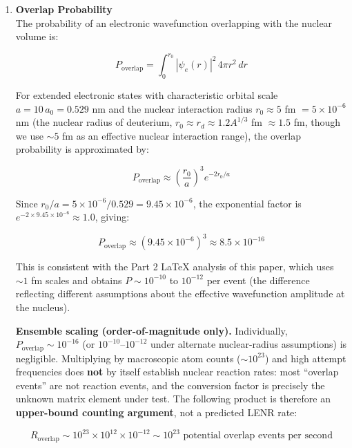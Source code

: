 \documentclass[11pt,a4paper]{article}
\begin{document}
\begin{enumerate}
\def\labelenumi{\arabic{enumi}.}
\item
  \textbf{Overlap Probability}\\
  The probability of an electronic wavefunction overlapping with the nuclear volume is:

  \begin{equation}
P_{\text{overlap}} = \int_{0}^{r_0} |\psi_e(r)|^2 \, 4\pi r^2 \, dr
\end{equation}

  For extended electronic states with characteristic orbital scale $a = 10\,a_0 = 0.529$ nm and the nuclear interaction radius $r_0 \approx 5$ fm $= 5 \times 10^{-6}$ nm (the nuclear radius of deuterium, $r_0 \approx r_d \approx 1.2 A^{1/3}$ fm $\approx 1.5$ fm, though we use $\sim 5$ fm as an effective nuclear interaction range), the overlap probability is approximated by:

  \begin{equation}
P_{\text{overlap}} \approx \left(\frac{r_0}{a}\right)^3 e^{-2r_0/a}
\end{equation}

  Since $r_0/a = 5 \times 10^{-6} / 0.529 = 9.45 \times 10^{-6}$, the exponential factor is $e^{-2 \times 9.45 \times 10^{-6}} \approx 1.0$, giving:

  \begin{equation}
P_{\text{overlap}} \approx (9.45 \times 10^{-6})^3 \approx 8.5 \times 10^{-16}
\end{equation}

  This is consistent with the Part 2 LaTeX analysis of this paper, which uses $\sim 1$ fm scales and obtains $P \sim 10^{-10}$ to $10^{-12}$ per event (the difference reflecting different assumptions about the effective wavefunction amplitude at the nucleus).

  \textbf{Ensemble scaling (order-of-magnitude only).} Individually, $P_{\text{overlap}} \sim 10^{-16}$ (or $10^{-10}$--$10^{-12}$ under alternate nuclear-radius assumptions) is negligible. Multiplying by macroscopic atom counts ($\sim 10^{23}$) and high attempt frequencies does \textbf{not} by itself establish nuclear reaction rates: most ``overlap events'' are not reaction events, and the conversion factor is precisely the unknown matrix element under test. The following product is therefore an \textbf{upper-bound counting argument}, not a predicted LENR rate:

  \begin{equation}
R_{\text{overlap}} \sim 10^{23} \times 10^{12} \times 10^{-12} \sim 10^{23} \text{ potential overlap events per second}
\end{equation}


\end{enumerate}
\end{document}
